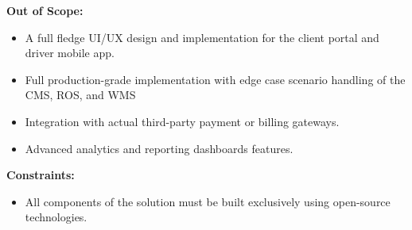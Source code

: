 \textbf{Out of Scope:}
\begin{itemize}
    \item A full fledge UI/UX design and implementation for the client portal and driver mobile app.
    \item Full production-grade implementation with edge case scenario handling of the CMS, ROS, and WMS
    \item Integration with actual third-party payment or billing gateways.
    \item Advanced analytics and reporting dashboards features.
\end{itemize}

\textbf{Constraints:}
\begin{itemize}
    \item All components of the solution must be built exclusively using open-source technologies.
\end{itemize}

